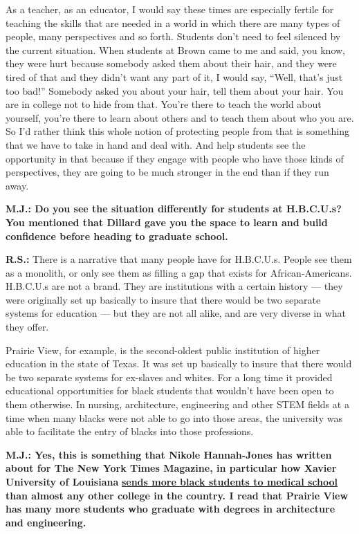 As a teacher, as an educator, I would say these times are especially
fertile for teaching the skills that are needed in a world in which
there are many types of people, many perspectives and so forth. Students
don't need to feel silenced by the current situation. When students at
Brown came to me and said, you know, they were hurt because somebody
asked them about their hair, and they were tired of that and they didn't
want any part of it, I would say, ``Well, that's just too bad!''
Somebody asked you about your hair, tell them about your hair. You are
in college not to hide from that. You're there to teach the world about
yourself, you're there to learn about others and to teach them about who
you are. So I'd rather think this whole notion of protecting people from
that is something that we have to take in hand and deal with. And help
students see the opportunity in that because if they engage with people
who have those kinds of perspectives, they are going to be much stronger
in the end than if they run away.

\textbf{M.J.: Do you see the situation differently for students at
H.B.C.U.s? You mentioned that Dillard gave you the space to learn and
build confidence before heading to graduate school.}

\textbf{R.S.:} There is a narrative that many people have for H.B.C.U.s.
People see them as a monolith, or only see them as filling a gap that
exists for African-Americans. H.B.C.U.s are not a brand. They are
institutions with a certain history --- they were originally set up
basically to insure that there would be two separate systems for
education --- but they are not all alike, and are very diverse in what
they offer.

Prairie View, for example, is the second-oldest public institution of
higher education in the state of Texas. It was set up basically to
insure that there would be two separate systems for ex-slaves and
whites. For a long time it provided educational opportunities for black
students that wouldn't have been open to them otherwise. In nursing,
architecture, engineering and other STEM fields at a time when many
blacks were not able to go into those areas, the university was able to
facilitate the entry of blacks into those professions.

\textbf{M.J.: Yes, this is something that Nikole Hannah-Jones has
written about for The New York Times Magazine, in particular how Xavier
University of Louisiana}
\textbf{\href{https://www.nytimes3xbfgragh.onion/2015/09/13/magazine/a-prescription-for-more-black-doctors.html}{sends
more black students to medical school}} \textbf{than almost any other
college in the country. I read that Prairie View has many more students
who graduate with degrees in architecture and engineering.}

